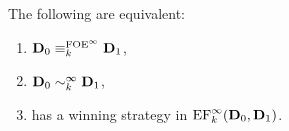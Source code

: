 \begin{lemma}\label{lem:connolque}
	The following are equivalent:
	\begin{enumerate}
		 pt
		\item\label{lem:connolque:i} $\mathbf{D}_0 \equiv_k^{\mathrm{FOE}^{\infty}} \mathbf{D}_1$,
		\item\label{lem:connolque:ii} $\mathbf{D}_0 \sim_k^\infty \mathbf{D}_1$,
		\item\label{lem:connolque:iii} \eloise has a winning strategy in $\mathrm{EF}_k^\infty(\mathbf{D}_0,\mathbf{D}_1)$.
	\end{enumerate}
\end{lemma}


